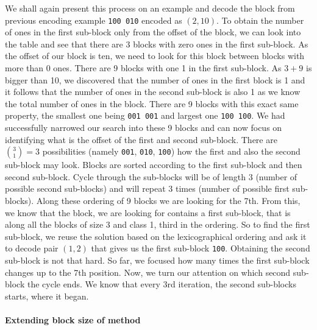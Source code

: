 We shall again present this process on an example and decode the block from previous
encoding example {\tt 100 010} encoded as $(2, 10)$. To obtain the number of ones in
the first sub-block only from the offset of the block, we can look into the table and
see that there are 3 blocks with zero ones in the first sub-block. As the offset of our
block is ten, we need to look for this block between blocks with more than 0 ones. There
are 9 blocks with one 1 in the first sub-block. As $3+9$ is bigger than 10, we discovered
that the number of ones in the first block is 1 and it follows that the number of ones in
the second sub-block is
also 1 as we know the total number of ones in the block. There are 9 blocks with
this exact same property, the smallest one being {\tt 001 001} and largest one
{\tt 100 100}. We had successfully narrowed our search into these 9 blocks and can now
focus on identifying what is the offset of the first and second sub-block. There are
${3 \choose 1} = 3$ possibilities (namely {\tt 001}, {\tt 010}, {\tt 100}) how the first
and also the second sub-block may look. Blocks are sorted according
to the first sub-block and then second sub-block. Cycle through
the sub-blocks will be of length 3 (number of possible second sub-blocks) and will repeat
3 times (number of possible first sub-blocks). Along these ordering of 9 blocks we are
looking for the 7th. From this, we know that the block, we are looking for contains a
first sub-block, that is along all the blocks of size 3 and class 1, third in the ordering.
So to find the first sub-block, we reuse the solution based on the lexicographical ordering
and ask it to decode pair $(1, 2)$ that gives us the first sub-block {\tt 100}. Obtaining
the second sub-block is not that hard. So far, we focused how many times the first sub-block
changes up to the 7th position. Now, we turn our attention on which second sub-block the cycle
ends. We know that every 3rd iteration, the second sub-blocks starts, where it began.

\paragraph{Extending block size of method}

